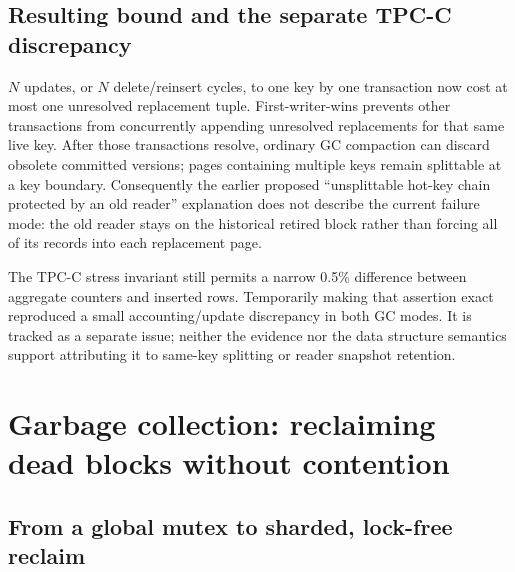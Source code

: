 \documentclass[11pt]{article}
\begin{document}
\subsection{Resulting bound and the separate TPC-C discrepancy}

$N$ updates, or $N$ delete/reinsert cycles, to one key by one transaction now cost at
most one unresolved replacement tuple. First-writer-wins prevents other transactions
from concurrently appending unresolved replacements for that same live key. After those
transactions resolve, ordinary GC compaction can discard obsolete committed versions;
pages containing multiple keys remain splittable at a key boundary. Consequently the
earlier proposed ``unsplittable hot-key chain protected by an old reader'' explanation
does not describe the current failure mode: the old reader stays on the historical
retired block rather than forcing all of its records into each replacement page.

The TPC-C stress invariant still permits a narrow 0.5\% difference between aggregate
 counters and inserted  rows. Temporarily making that
assertion exact reproduced a small accounting/update discrepancy in both GC modes. It
is tracked as a separate issue; neither the evidence nor the data structure semantics
support attributing it to same-key splitting or reader snapshot retention.

\section{Garbage collection: reclaiming dead blocks without contention}
\label{sec:gc}

\subsection{From a global mutex to sharded, lock-free reclaim}
\end{document}
